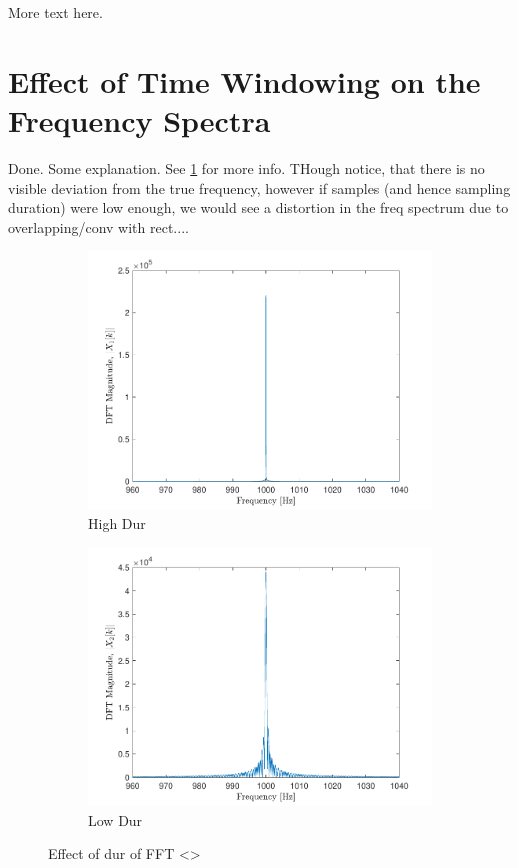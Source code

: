 \documentclass[10pt]{article}
\begin{document}
More text here.

\section{Effect of Time Windowing on the Frequency Spectra}

Done. Some explanation. See \ref{time_bandwidth_tradeoff} for more info. THough notice, that there is no visible deviation from the true frequency, however if samples (and hence sampling duration) were low enough, we would see a distortion in the freq spectrum due to overlapping/conv with rect....

\begin{figure}[ht]
    \centering
    \begin{subfigure}[b]{0.48\textwidth}
        \includegraphics[width=\textwidth]{problem2_fft_high_dur.pdf}
        \caption{High Dur}
    \end{subfigure}
    \quad
    \begin{subfigure}[b]{0.48\textwidth}
        \includegraphics[width=\textwidth]{problem2_fft_low_dur.pdf}
        \caption{Low Dur}
    \end{subfigure}
    \caption{Effect of dur of FFT <>\vspace{-0.5cm}}
    \label{time_bandwidth_tradeoff}
\end{figure}
\end{document}

